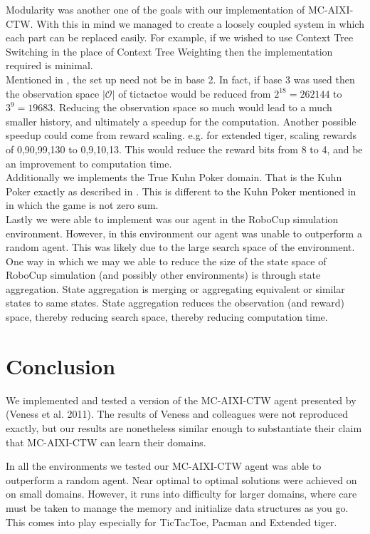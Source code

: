 \documentclass{article}
\theoremstyle{definition}
\newtheorem{primary statistics}[definition]{Primary Statistics}
\newtheorem{auxiliary statistics}[definition]{Auxiliary Statistics}
\begin{document}
Modularity was another one of the goals with our implementation of MC-AIXI-CTW. With this in mind we managed to create a loosely coupled system in which each part can be replaced easily. For example, if we wished to use Context Tree Switching \citep{veness2012context} in the place of Context Tree Weighting then the implementation required is minimal. \\

Mentioned in \citep{veness2011monte}, the set up need not be in base 2. In fact, if base 3 was used then the observation space $|\mathcal{O}|$ of tictactoe would be reduced from $2^{18}=262144$ to $3^9 = 19683$. Reducing the observation space so much would lead to a much smaller history, and ultimately a speedup for the computation. Another possible speedup could come from reward scaling.  e.g. for extended tiger, scaling rewards of 0,90,99,130 to 0,9,10,13. This would reduce the reward bits from 8 to 4, and be an improvement to computation time. \\

Additionally we implements the True Kuhn Poker domain. That is the Kuhn Poker exactly as described in \citep{kuhn1950simplified}. This is different to the Kuhn Poker mentioned in  \citep{veness2011monte} in which the game is not zero sum. \\

Lastly we were able to implement was our agent in the RoboCup simulation environment. However, in this environment our agent was unable to outperform a random agent. This was likely due to the large search space of the environment. One way in which we may we able to reduce the size of the state space of RoboCup simulation (and possibly other environments) is through state aggregation. State aggregation is merging or aggregating equivalent or similar states to same states. State aggregation reduces the observation (and reward) space, thereby reducing search space, thereby reducing computation time.


\section{Conclusion}
We implemented and tested a version of the MC-AIXI-CTW agent presented by (Veness et al. 2011). The results of Veness and colleagues were not reproduced exactly, but our results are nonetheless similar enough to substantiate their claim that MC-AIXI-CTW can learn their domains.

In all the environments we tested our MC-AIXI-CTW agent was able to outperform a random agent. Near optimal to optimal solutions were achieved on on small domains. However, it runs into difficulty for larger domains, where care must be taken to manage the memory and initialize data structures as you go. This comes into play especially for TicTacToe, Pacman and Extended tiger. 
\end{document}
